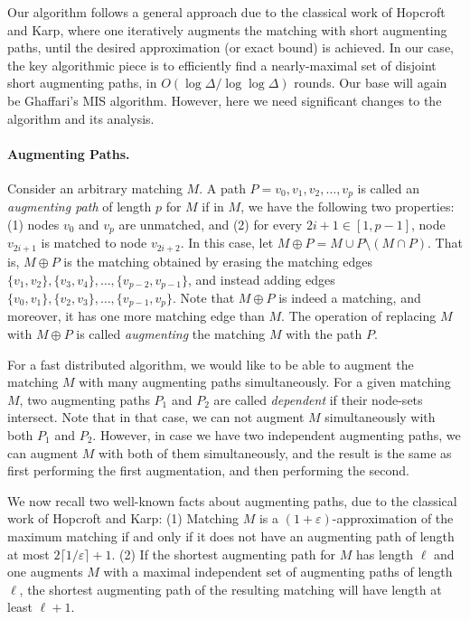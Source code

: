 \documentclass[11pt]{article}
\newcommand{\eps}{\varepsilon}
\begin{document}
Our algorithm follows a general approach due to the classical work of Hopcroft and Karp\cite{HopcroftKarp1973}, where one iteratively augments the matching with short augmenting paths, until the desired approximation (or exact bound) is achieved. In our case, the key algorithmic piece is to efficiently find a nearly-maximal set of disjoint short augmenting paths, in $O(\log \Delta/\log\log \Delta)$ rounds. Our base will again be Ghaffari's MIS algorithm\cite{Ghaffari2016}. However, here we need significant changes to the algorithm and its analysis.

\paragraph{Augmenting Paths.} Consider an arbitrary matching $M$. A path $P={v_0, v_1, v_2, \dots, v_{p}}$ is called an \emph{augmenting path} of length $p$ for $M$ if in $M$, we have the following two properties: (1) nodes $v_0$ and $v_p$ are unmatched, and (2) for every $2i+1\in [1, p-1]$, node $v_{2i+1}$ is matched to node $v_{2i+2}$. In this case, let $M\oplus P=M\cup P \setminus (M\cap P)$. That is, $M\oplus P$ is the matching obtained by erasing the matching edges $\{v_{1}, v_{2}\}, \{v_{3}, v_{4}\}, \dots, \{v_{p-2}, v_{p-1}\}$, and instead adding edges $\{v_{0}, v_{1}\}, \{v_{2}, v_{3}\}, \dots, \{v_{p-1}, v_{p}\}$. Note that $M \oplus P$ is indeed a matching, and moreover, it has one more matching edge than $M$. The operation of replacing $M$ with $M\oplus P$ is called \emph{augmenting} the matching $M$ with the path $P$.

For a fast distributed algorithm, we would like to be able to augment the matching $M$ with many augmenting paths simultaneously. For a given matching $M$, two augmenting paths $P_1$ and $P_2$ are called \emph{dependent} if their node-sets intersect. Note that in that case, we can not augment $M$ simultaneously with both $P_1$ and $P_2$. However, in case we have two independent augmenting paths, we can augment $M$ with both of them simultaneously, and the result is the same as first performing the first augmentation, and then performing the second.

We now recall two well-known facts about augmenting paths, due to the classical work of Hopcroft and Karp\cite{HopcroftKarp1973}: (1) Matching $M$ is a $(1+\eps)$-approximation of the maximum matching if and only if it does not have an augmenting path of length at most $2\lceil{1/\eps}\rceil+1$. (2) If the shortest augmenting path for $M$ has length $\ell$ and one augments $M$ with a maximal independent set of augmenting paths of length $\ell$, the shortest augmenting path of the resulting matching will have length at least $\ell+1$.
\end{document}
